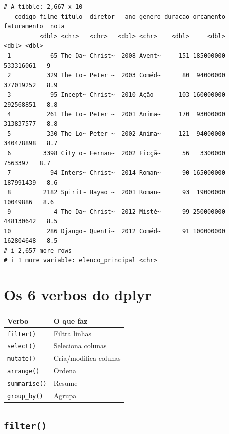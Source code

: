 \documentclass[
  letterpaper,
]{scrbook}
\newcounter{none} %
\begin{document}
\begin{verbatim}
# A tibble: 2,667 x 10
   codigo_filme titulo  diretor   ano genero duracao orcamento faturamento  nota
          <dbl> <chr>   <chr>   <dbl> <chr>    <dbl>     <dbl>       <dbl> <dbl>
 1           65 The Da~ Christ~  2008 Avent~     151 185000000   533316061   9  
 2          329 The Lo~ Peter ~  2003 Coméd~      80  94000000   377019252   8.9
 3           95 Incept~ Christ~  2010 Ação       103 160000000   292568851   8.8
 4          261 The Lo~ Peter ~  2001 Anima~     170  93000000   313837577   8.8
 5          330 The Lo~ Peter ~  2002 Anima~     121  94000000   340478898   8.7
 6         3398 City o~ Fernan~  2002 Ficçã~      56   3300000     7563397   8.7
 7           94 Inters~ Christ~  2014 Roman~      90 165000000   187991439   8.6
 8         2182 Spirit~ Hayao ~  2001 Roman~      93  19000000    10049886   8.6
 9            4 The Da~ Christ~  2012 Misté~      99 250000000   448130642   8.5
10          286 Django~ Quenti~  2012 Coméd~      91 100000000   162804648   8.5
# i 2,657 more rows
# i 1 more variable: elenco_principal <chr>
\end{verbatim}

\section*{Os 6 verbos do dplyr}\label{os-6-verbos-do-dplyr}


{\def\LTcaptype{none} %
\begin{longtable}[]{@{}ll@{}}
\toprule\noalign{}
Verbo & O que faz \\
\midrule\noalign{}
\endhead
\bottomrule\noalign{}
\endlastfoot
\texttt{filter()} & Filtra linhas \\
\texttt{select()} & Seleciona colunas \\
\texttt{mutate()} & Cria/modifica colunas \\
\texttt{arrange()} & Ordena \\
\texttt{summarise()} & Resume \\
\texttt{group\_by()} & Agrupa \\
\end{longtable}
}

\subsection{\texorpdfstring{\texttt{filter()}}{filter()}}\label{filter}
\end{document}
